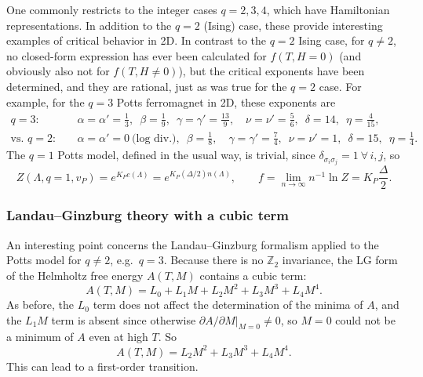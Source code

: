One commonly restricts to the integer cases $q = 2,3,4$, which have Hamiltonian representations. In
addition to the $q = 2$ (Ising) case, these provide interesting examples of critical behavior in 2D. In
contrast to the $q = 2$ Ising case, for $q\ne 2$, no closed-form expression has ever been calculated for
$f(T,H=0)$ (and obviously also not for $f(T,H\ne 0)$), but the critical exponents have been determined,
and they are rational, just as was true for the $q = 2$ case. For example, for the $q = 3$ Potts
ferromagnet in 2D, these exponents are
\begin{align*}
  q = 3:&\quad \alpha = \alpha' = \frac{1}{3},\enspace \beta = \frac{1}{9},\enspace \gamma = \gamma' = \frac{13}{9},
          \quad \nu = \nu' = \frac{5}{6},\enspace \delta = 14,\enspace \eta = \frac{4}{15},\\
  \text{vs. } q = 2:&\quad \alpha = \alpha' = 0\ \text{(log div.)},\enspace \beta = \frac{1}{8},\quad
          \gamma = \gamma' = \frac{7}{4},\enspace \nu = \nu' = 1,\enspace \delta = 15,\enspace \eta = \frac{1}{4} .
\end{align*}
The $q = 1$ Potts model, defined in the usual way, is trivial, since $\delta_{\sigma_i\sigma_j} = 1\ \forall\,i,j$,
so
\begin{equation}
  Z(\Lambda,q=1,v_P) = e^{K_Pe(\Lambda)} = e^{K_P(\Delta/2)n(\Lambda)},\qquad
  f = \lim_{n\to\infty}n^{-1}\ln Z = K_P\frac{\Delta}{2} .
\end{equation}

\subsubsection*{Landau--Ginzburg theory with a cubic term}

An interesting point concerns the Landau--Ginzburg formalism applied to the Potts model for $q\ne 2$,
e.g.\ $q = 3$. Because there is no $\mathbb{Z}_2$ invariance, the LG form of the Helmholtz free energy
$A(T,M)$ contains a cubic term:
\begin{equation}
  A(T,M) = L_0 + L_1M + L_2M^2 + L_3M^3 + L_4M^4 .
\end{equation}
As before, the $L_0$ term does not affect the determination of the minima of $A$, and the $L_1M$ term is
absent since otherwise $\left.\partial A/\partial M\right|_{M=0}\ne 0$, so $M = 0$ could not be a minimum of $A$ even at
high $T$. So
\begin{equation}
  A(T,M) = L_2M^2 + L_3M^3 + L_4M^4 .
\end{equation}
This can lead to a first-order transition.

